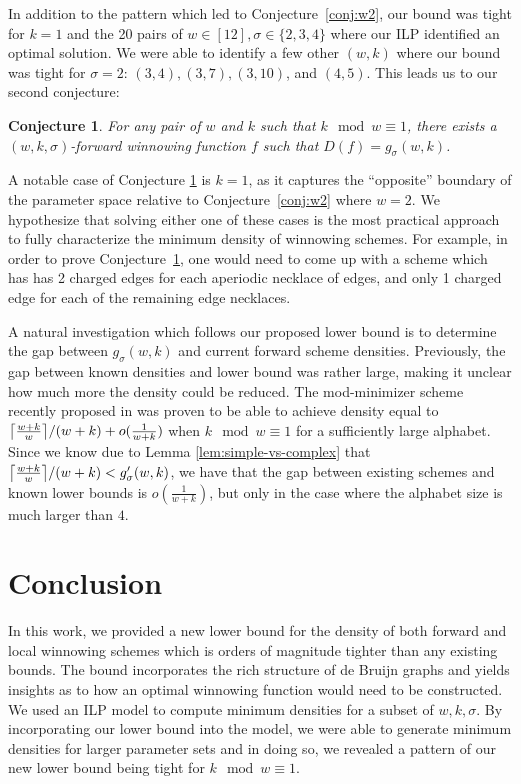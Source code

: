 \documentclass{article}
\newtheorem{conjecture}[theorem]{Conjecture}
\DeclarePairedDelimiter\ceil{\lceil}{\rceil}
\begin{document}
In addition to the pattern which led to Conjecture~\ref{conj:w2}, our bound was tight for $k=1$ and the 20 pairs of $w\in[12], \sigma \in \{2, 3, 4\}$ where our ILP identified an optimal solution. We were able to identify a few other $(w,k)$ where our bound was tight for $\sigma=2$: $(3, 4), (3, 7), (3, 10)$, and $(4, 5)$. This leads us to our second conjecture:  
\begin{conjecture}
    \label{conj:k1mw}
For any pair of $w$ and $k$ such that $k\mod w \equiv 1$,  there exists a $(w,k,\sigma)$-forward winnowing function $f$ such that $D(f)=g_\sigma(w, k)$.
\end{conjecture} 
A notable case of Conjecture \ref{conj:k1mw} is $k=1$, as it captures the ``opposite'' boundary of the parameter space relative to Conjecture~\ref{conj:w2} where $w=2$. We hypothesize that solving either one of these cases is the most practical approach to fully characterize the minimum density of winnowing schemes. For example, in order to prove Conjecture~\ref{conj:k1mw}, one would need to come up with a scheme which has has 2 charged edges for each aperiodic necklace of edges, and only 1 charged edge for each of the remaining edge necklaces. 

A natural investigation which follows our proposed lower bound is to determine the gap between $g_\sigma(w,k)$ and current forward scheme densities. Previously, the gap between known densities and lower bound was rather large, making it unclear how much more the density could be reduced. The mod-minimizer scheme recently proposed in \cite{groot2024mod} was proven to be able to achieve density equal to ${\ceil*{\frac{w+k}{w}}}/{(w+k)} + o(\frac{1}{w+k})$ when $k \mod w \equiv 1$ for a sufficiently large alphabet. Since we know due to Lemma \ref{lem:simple-vs-complex} that ${\ceil*{\frac{w+k}{w}}}/{(w+k)}< g_\sigma^\prime(w, k)$,  we have that the gap between existing schemes and known lower bounds is $o(\frac{1}{w+k})$, but only in the case where the alphabet size is much larger than $4$.   

\section{Conclusion}
In this work, we provided a new lower bound for the density of both forward and local winnowing schemes which is orders of magnitude tighter than any existing bounds. The bound incorporates the rich structure of de Bruijn graphs and yields insights as to how an optimal winnowing function would need to be constructed. We used an ILP model to compute minimum densities for a subset of $w, k, \sigma$. By incorporating our lower bound into the model, we were able to generate minimum densities for larger parameter sets and in doing so, we revealed a pattern of our new lower bound being tight for $k\mod w\equiv 1$.
\end{document}
